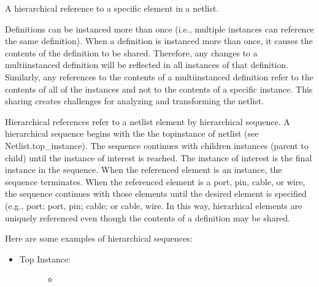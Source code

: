 \documentclass[letterpaper,10pt,english,openany,oneside]{sphinxmanual}
\begin{document}
\begin{fulllineitems}
\label{\detokenize{reference/classes/href:spydrnet.util.HRef}}
A hierarchical reference to a specific element in a netlist.

Definitions can be instanced more than once (i.e., multiple instances can reference the same definition).
When a definition is instanced more than once, it causes the contents of the definition to be shared. Therefore, any
changes to a multi\sphinxhyphen{}instanced definition will be reflected in all instances of that definition. Similarly, any
references to the contents of a multi\sphinxhyphen{}instanced definition refer to the contents of all of the instances and not to
the contents of a specific instance. This sharing creates challenges for analyzing and transforming the netlist.

Hierarchical references refer to a netlist element by hierarchical sequence. A hierarchical sequence begins with the
the top\sphinxhyphen{}instance of netlist (see Netlist.top\_instance). The sequence continues with children instances (parent to
child) until the instance of interest is reached. The instance of interest is the final instance in the sequence.
When the referenced element is an instance, the sequence terminates. When the referenced element is a port, pin,
cable, or wire, the sequence continues with those elements until the desired element is specified (e.g., port;
port, pin; cable; or cable, wire. In this way, hierarhical elements are uniquely referenced even though the contents
of a definition may be shared.


Here are some examples of hierarchical sequences:
\begin{itemize}
\item {} \begin{description}
\item[{Top Instance:}] \leavevmode\begin{itemize}
\item {} 

\end{itemize}

\end{description}


\end{itemize}
\end{fulllineitems}
\end{document}

